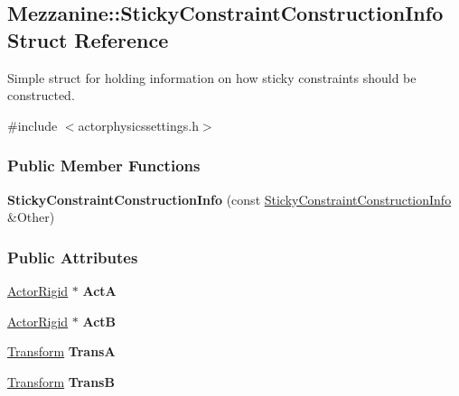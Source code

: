 \hypertarget{structMezzanine_1_1StickyConstraintConstructionInfo}{
\subsection{Mezzanine::StickyConstraintConstructionInfo Struct Reference}
\label{structMezzanine_1_1StickyConstraintConstructionInfo}
}


Simple struct for holding information on how sticky constraints should be constructed.  




{\ttfamily \#include $<$actorphysicssettings.h$>$}

\subsubsection*{Public Member Functions}
\begin{DoxyCompactItemize}
\item 
\hypertarget{structMezzanine_1_1StickyConstraintConstructionInfo_a688d212887cd0e9aa1f4dea442874d8d}{
{\bfseries StickyConstraintConstructionInfo} (const \hyperlink{structMezzanine_1_1StickyConstraintConstructionInfo}{StickyConstraintConstructionInfo} \&Other)}
\label{structMezzanine_1_1StickyConstraintConstructionInfo_a688d212887cd0e9aa1f4dea442874d8d}

\end{DoxyCompactItemize}
\subsubsection*{Public Attributes}
\begin{DoxyCompactItemize}
\item 
\hypertarget{structMezzanine_1_1StickyConstraintConstructionInfo_a5987732586b65cbe74571e92adb3f0ae}{
\hyperlink{classMezzanine_1_1ActorRigid}{ActorRigid} $\ast$ {\bfseries ActA}}
\label{structMezzanine_1_1StickyConstraintConstructionInfo_a5987732586b65cbe74571e92adb3f0ae}

\item 
\hypertarget{structMezzanine_1_1StickyConstraintConstructionInfo_aad1e7e1d6dbc8a024edbca49ca237908}{
\hyperlink{classMezzanine_1_1ActorRigid}{ActorRigid} $\ast$ {\bfseries ActB}}
\label{structMezzanine_1_1StickyConstraintConstructionInfo_aad1e7e1d6dbc8a024edbca49ca237908}

\item 
\hypertarget{structMezzanine_1_1StickyConstraintConstructionInfo_a3bbd9718957c975863dc5027a498ec45}{
\hyperlink{classMezzanine_1_1Transform}{Transform} {\bfseries TransA}}
\label{structMezzanine_1_1StickyConstraintConstructionInfo_a3bbd9718957c975863dc5027a498ec45}

\item 
\hypertarget{structMezzanine_1_1StickyConstraintConstructionInfo_a72b860662c5eb05c6c97ea703a3eda04}{
\hyperlink{classMezzanine_1_1Transform}{Transform} {\bfseries TransB}}
\label{structMezzanine_1_1StickyConstraintConstructionInfo_a72b860662c5eb05c6c97ea703a3eda04}

\end{DoxyCompactItemize}


